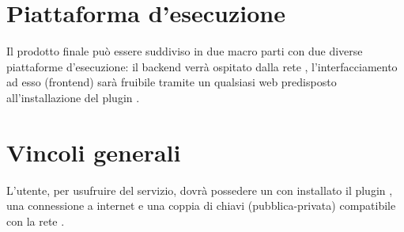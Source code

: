 \documentclass[AnalisiDeiRequisiti.tex]{subfiles}
\begin{document}
\section{Piattaforma d'esecuzione}
Il prodotto finale può essere suddiviso in due macro parti con due diverse piattaforme d'esecuzione: il backend verrà ospitato dalla rete , l'interfacciamento ad esso (frontend) sarà fruibile tramite un qualsiasi  web predisposto all'installazione del plugin .
\section{Vincoli generali}
L'utente, per usufruire del servizio, dovrà possedere un  con installato il plugin , una connessione a internet e una coppia di chiavi (pubblica-privata) compatibile con la rete .	
\end{document}
